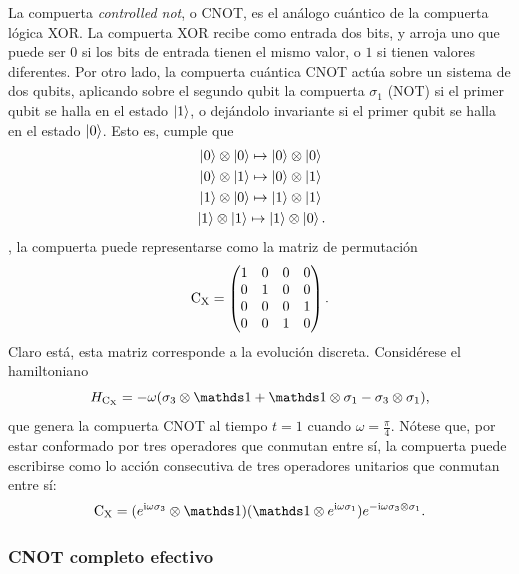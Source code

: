 La compuerta \textit{controlled not}, o CNOT, es el análogo cuántico de la compuerta lógica XOR. La compuerta XOR recibe como entrada dos bits, y arroja uno que puede ser $0$ si los bits de entrada tienen el mismo valor, o $1$ si tienen valores diferentes. Por otro lado, la compuerta cuántica CNOT actúa sobre un sistema de dos qubits, aplicando sobre el segundo qubit la compuerta $\sigma_{1}$ (NOT) si el primer qubit se halla en el estado $\ket{1}$, o dejándolo invariante si el primer qubit se halla en el estado $\ket{0}$. Esto es, cumple que \cite{Chuang}
\begin{align}
    \ket{0}\otimes\ket{0}\mapsto\ket{0}\otimes\ket{0}\nonumber\\
    \ket{0}\otimes\ket{1}\mapsto\ket{0}\otimes\ket{1}\nonumber\\
    \ket{1}\otimes\ket{0}\mapsto\ket{1}\otimes\ket{1}\nonumber\\
    \ket{1}\otimes\ket{1}\mapsto\ket{1}\otimes\ket{0} \rlap{.}\nonumber
\end{align}
, la compuerta puede representarse como la matriz de permutación
\begin{equation}
    \text{C}_{\text{X}}=\begin{pmatrix}
        1&0&0&0\\
        0&1&0&0\\
        0&0&0&1\\
        0&0&1&0
    \end{pmatrix}.\nonumber
\end{equation}
Claro está, esta matriz corresponde a la evolución discreta. Considérese el hamiltoniano
\begin{equation}
  H_{\cnot}=-\omega(\pauli{3}\otimes\Id+\Id\otimes\pauli{1}-\pauli{3}\otimes\pauli{1}),\nonumber
\end{equation}
que genera la compuerta CNOT al tiempo $t=1$ cuando $\omega=\frac{\pi}{4}$. Nótese que, por estar conformado por tres operadores que conmutan entre sí, la compuerta puede escribirse como lo acción consecutiva de tres operadores unitarios que conmutan entre sí:
\begin{equation}
  \cnot=(e^{\rmi\omega\pauli{3}}\otimes \Id) (\Id \otimes e^{\rmi\omega\pauli{1}}) e^{-\rmi\omega\pauli{3}\otimes\pauli{1}}.\nonumber
\end{equation}

\subsubsection{CNOT completo efectivo}

